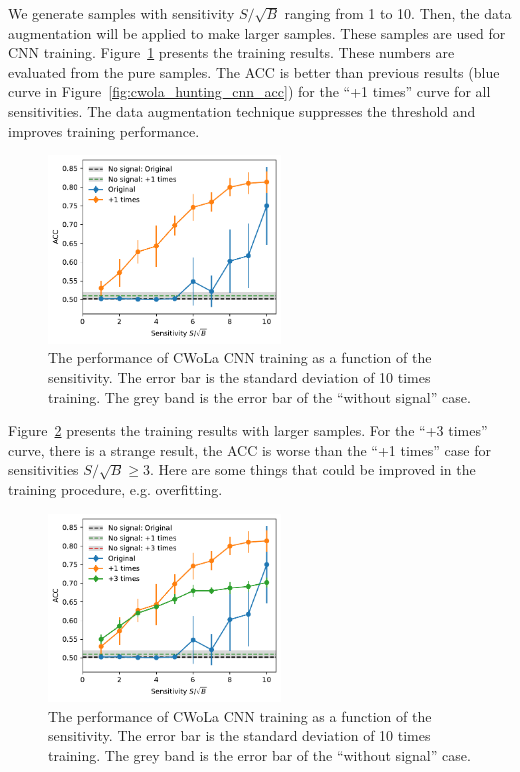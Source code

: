 \documentclass[12pt]{article}
\begin{document}
        We generate samples with sensitivity $S / \sqrt{B}$ ranging from 1 to 10. Then, the data augmentation will be applied to make larger samples. These samples are used for CNN training. Figure~\ref{fig:cwola_hunting_cnn_acc_data_augmetation} presents the training results. These numbers are evaluated from the pure samples. The ACC is better than previous results (blue curve in Figure~\ref{fig:cwola_hunting_cnn_acc}) for the ``+1 times'' curve for all sensitivities. The data augmentation technique suppresses the threshold and improves training performance.

        \begin{figure}[htpb]
            \centering
            \includegraphics[width=0.55\textwidth]{HVmodel_CWoLa_CNN_aug_1.pdf}
            \caption{The performance of CWoLa CNN training as a function of the sensitivity. The error bar is the standard deviation of 10 times training. The grey band is the error bar of the ``without signal'' case.}
            \label{fig:cwola_hunting_cnn_acc_data_augmetation}
        \end{figure}

         Figure~\ref{fig:cwola_hunting_cnn_acc_data_augmetation_3_times} presents the training results with larger samples. For the ``+3 times'' curve, there is a strange result, the ACC is worse than the ``+1 times'' case for sensitivities $S / \sqrt{B} \ge 3$. Here are some things that could be improved in the training procedure, e.g. overfitting.
        \begin{figure}[htpb]
            \centering
            \includegraphics[width=0.55\textwidth]{HVmodel_CWoLa_CNN_aug_1_3.pdf}
            \caption{The performance of CWoLa CNN training as a function of the sensitivity. The error bar is the standard deviation of 10 times training. The grey band is the error bar of the ``without signal'' case.}
            \label{fig:cwola_hunting_cnn_acc_data_augmetation_3_times}
        \end{figure}
\end{document}
